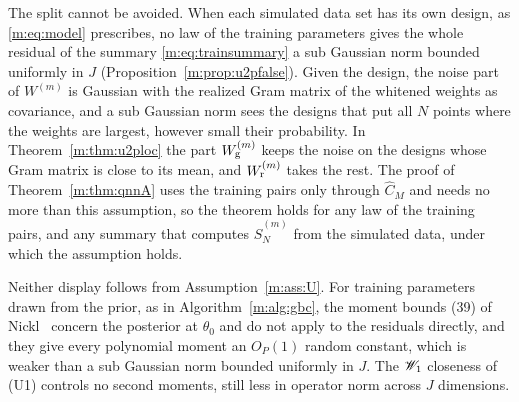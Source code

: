 \begin{remark}\label{m:rem:u2p}
The split cannot be avoided. When each simulated data set has its own design, as \eqref{m:eq:model} prescribes, no law of the training parameters gives the whole residual of the summary \eqref{m:eq:trainsummary} a sub Gaussian norm bounded uniformly in $J$ (Proposition~\ref{m:prop:u2pfalse}). Given the design, the noise part of $W^{(m)}$ is Gaussian with the realized Gram matrix of the whitened weights as covariance, and a sub Gaussian norm sees the designs that put all $N$ points where the weights are largest, however small their probability. In Theorem~\ref{m:thm:u2ploc} the part $W^{(m)}_{\rm g}$ keeps the noise on the designs whose Gram matrix is close to its mean, and $W^{(m)}_{\rm r}$ takes the rest. The proof of Theorem~\ref{m:thm:qnnA} uses the training pairs only through $\hat C_M$ and needs no more than this assumption, so the theorem holds for any law of the training pairs, and any summary that computes $\hat S^{(m)}_N$ from the simulated data, under which the assumption holds.

Neither display follows from Assumption~\ref{m:ass:U}. For training parameters drawn from the prior, as in Algorithm~\ref{m:alg:gbc}, the moment bounds (39) of Nickl~\cite{nicklbvm2024} concern the posterior at $\theta_0$ and do not apply to the residuals directly, and they give every polynomial moment an $O_P(1)$ random constant, which is weaker than a sub Gaussian norm bounded uniformly in $J$. The $\mathscr{W}_1$ closeness of (U1) controls no second moments, still less in operator norm across $J$ dimensions.


\end{remark}
